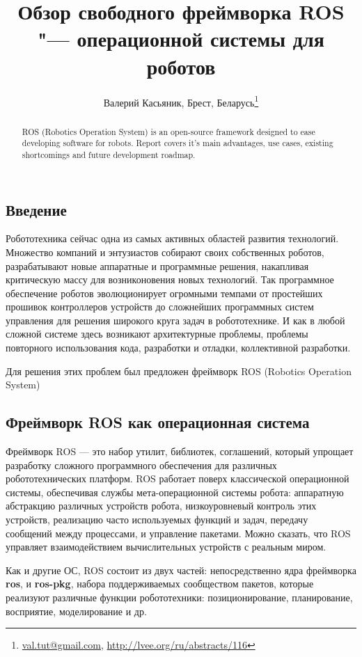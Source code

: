 \documentclass[10pt, a5paper]{article}
\begin{document}
\title{Обзор свободного фреймворка ROS "--- операционной системы для роботов}
\author{Валерий Касьяник, Брест, Беларусь\footnote{\url{val.tut@gmail.com}, \url{http://lvee.org/ru/abstracts/116}}}
\maketitle
\begin{abstract}
ROS (Robotics Operation System) is an open-source framework designed to ease developing software for robots. Report covers it's main  advantages, use cases, existing shortcomings and future development roadmap.
\end{abstract}
\subsection*{Введение}

Робототехника сейчас одна из самых активных областей развития технологий. Множество компаний и  энтузиастов собирают своих собственных роботов, разрабатывают новые аппаратные и программные решения, накапливая критическую массу для возниконовения новых технологий. Так программное обеспечение роботов эволюционирует огромными темпами от простейших прошивок контроллеров устройств до сложнейших программных систем управления для решения широкого круга задач в робототехнике. И как в любой сложной системе здесь возникают архитектурные проблемы, проблемы повторного использования кода, разработки и отладки, коллективной разработки.

Для решения этих проблем был предложен фреймворк ROS  (Robotics Operation System) %

\subsection*{Фреймворк ROS как операционная система}

Фреймворк ROS — это набор утилит, библиотек, соглашений, который упрощает разработку сложного программного обеспечения для различных робототехнических платформ. ROS работает поверх классической операционной системы, обеспечивая службы мета-операционной системы робота: аппаратную абстракцию различных устройств робота, низкоуровневый контроль этих устройств, реализацию часто используемых функций и задач, передачу сообщений между процессами, и управление пакетами. Можно сказать, что ROS управляет взаимодействием вычислительных устройств с реальным миром.

Как и другие ОС, ROS состоит из двух частей: непосредственно ядра фреймворка \textbf{ros}, и \textbf{ros-pkg}, набора поддерживаемых сообществом пакетов, которые реализуют различные функции робототехники: позиционирование, планирование, восприятие, моделирование и др.
\end{document}
